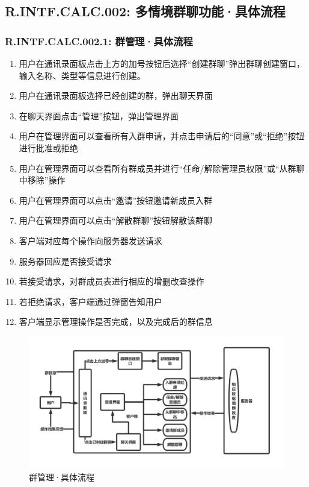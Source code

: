     \subsection{R.INTF.CALC.002: 多情境群聊功能·具体流程}
        \subsubsection{R.INTF.CALC.002.1: 群管理·具体流程}
        \begin{enumerate}
            \item 用户在通讯录面板点击上方的加号按钮后选择“创建群聊”弹出群聊创建窗口，输入名称、类型等信息进行创建。
            \item 用户在通讯录面板选择已经创建的群，弹出聊天界面
            \item 在聊天界面点击“管理”按钮，弹出管理界面
            \item 用户在管理界面可以查看所有入群申请，并点击申请后的“同意”或“拒绝”按钮进行批准或拒绝
            \item 用户在管理界面可以查看所有群成员并进行“任命/解除管理员权限”或“从群聊中移除”操作
            \item 用户在管理界面可以点击“邀请”按钮邀请新成员入群
            \item 用户在管理界面可以点击“解散群聊”按钮解散该群聊
            \item 客户端对应每个操作向服务器发送请求
            \item 服务器回应是否接受请求
            \item 若接受请求，对群成员表进行相应的增删改查操作
            \item 若拒绝请求，客户端通过弹窗告知用户
            \item 客户端显示管理操作是否完成，以及完成后的群信息
        \end{enumerate}
        \begin{figure}[h]
            \centering
            \includegraphics[scale=0.4]{OutlineDesign/figures/群管理具体流程.png}
            \caption{群管理·具体流程}
            \label{fig:server_flow}
        \end{figure}
